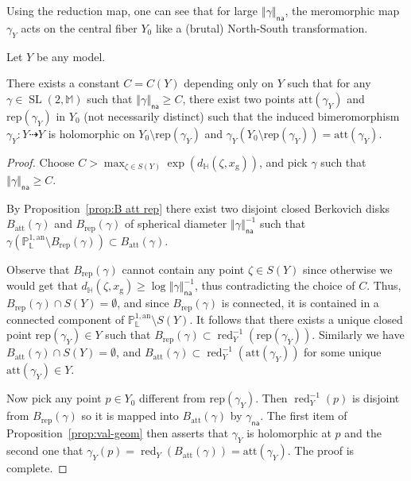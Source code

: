 \documentclass[10pt]{amsart}
\theoremstyle{definition}\newtheorem{defi}[theo]{Definition}\newtheorem{rema}[theo]{Remark}\newtheorem{exam}[theo]{Example}\newtheorem{exem}[theo]{Example}\newtheorem{nota}[theo]{Notation}
\DeclareMathOperator{\red}{red}
\DeclareMathOperator{\SL}{SL}
\newcommand{\hh}{\mathbb{H}}
\newcommand{\mm}{\mathbb{M}}
\newcommand{\an}{\mathrm{an}}
\newcommand{\norm}[1]{\left\Vert#1\right\Vert}
\newcommand{\PP}{\mathbb{P}}
\newcommand{\Laurent}{\mathbb{L}}
\newcommand{\att}{\mathrm{att}}
\newcommand{\rep}{\mathrm{rep}}
\newcommand{\na}{\mathsf{na}}
\begin{document}
Using the reduction map, one can see that for large $\norm{\gamma}_\na$, the meromorphic map $\gamma_Y$ acts on the central fiber $Y_0$ like a (brutal) North-South transformation.

\begin{prop}\label{prop:nordsud}
Let $Y$ be any model.

There exists a constant $C=C(Y)$ depending only on $Y$ such that for any $\gamma \in \SL(2,\mm)$ such that $\norm{\gamma}_\na\geq C$, there exist two points $\mathrm{att}(\gamma_Y)$ and $\mathrm{rep}(\gamma_Y)$ in $Y_0$ (not necessarily distinct) such that the induced bimeromorphism $\gamma_Y: Y \dashrightarrow Y$ is holomorphic on $Y_0\setminus \mathrm{rep}(\gamma_Y)$ and $\gamma_Y(Y_0\setminus \mathrm{rep}(\gamma_Y)) = \mathrm{att}(\gamma_Y)$.
\end{prop}
\begin{proof}
Choose $C > \max_{\zeta \in S(Y)} \exp(d_\hh (\zeta, x_{\mathrm{g}}))$, and pick $\gamma$ such that $\norm{\gamma}_\na\geq C$.

By Proposition~\ref{prop:B att rep} there exist two disjoint closed Berkovich disks $B_{\att}(\gamma)$ and $B_{\rep}(\gamma)$ of spherical diameter $\norm{\gamma}^{-1}_\na$ such that $\gamma (\PP^{1,\an}_{\Laurent}\setminus B_{\rep}(\gamma)) \subset B_{\att}(\gamma)$.

Observe that $ B_{\rep}(\gamma)$ cannot contain any point $\zeta \in S(Y)$ since otherwise we would get that $d_\hh (\zeta, x_{\mathrm{g}}) \ge \log \norm{\gamma}_\na^{-1}$, thus contradicting the choice of $C$. Thus, $ B_{\rep}(\gamma) \cap S(Y) = \emptyset$, and since $B_{\rep}(\gamma)$ is connected, it is contained in a connected component of $\PP^{1,\an}_{\Laurent}\setminus S(Y)$. It follows that there exists a unique closed point $\mathrm{rep}(\gamma_Y)\in Y$ such that $B_{\rep}(\gamma) \subset \red_Y^{-1}(\mathrm{rep}(\gamma_Y))$. Similarly we have $B_{\att}(\gamma) \cap S(Y) = \emptyset$, and $B_{\att}(\gamma)\subset \red_Y^{-1}(\mathrm{att}(\gamma_Y))$ for some unique $\mathrm{att}(\gamma_Y)\in Y$.

Now pick any point $p \in Y_0$ different from $\mathrm{rep}(\gamma_Y)$. Then $\red_Y^{-1}(p)$ is disjoint from $B_{\rep}(\gamma)$ so it is mapped into $B_{\att}(\gamma)$ by $\gamma_\na$. The first item of Proposition~\ref{prop:val-geom} then asserts that $\gamma_{Y}$ is holomorphic at $p$ and the second one that $\gamma_{Y}(p) =\red_Y(B_{\att}(\gamma)) = \mathrm{att}(\gamma_Y)$. The proof is complete.
\end{proof}
\end{document}
